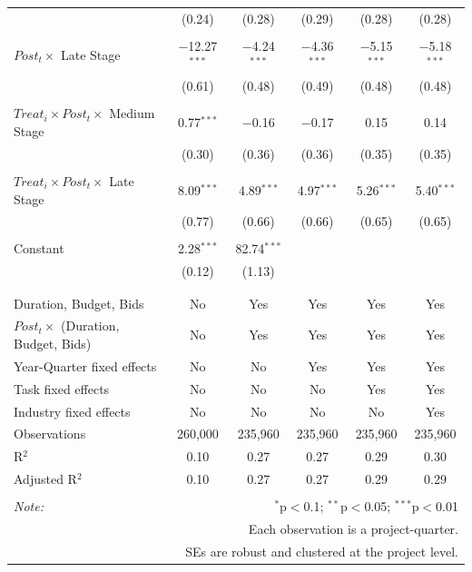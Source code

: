 \documentclass[
]{article}
\begin{document}
\begin{table}[H]
\begin{tabular}{@{\extracolsep{-2pt}}lccccc}
  & (0.24) & (0.28) & (0.29) & (0.28) & (0.28) \\ 
  & & & & & \\ 
 $Post_t \times$ Late Stage & $-$12.27$^{***}$ & $-$4.24$^{***}$ & $-$4.36$^{***}$ & $-$5.15$^{***}$ & $-$5.18$^{***}$ \\ 
  & (0.61) & (0.48) & (0.49) & (0.48) & (0.48) \\ 
  & & & & & \\ 
 $Treat_i \times Post_t \times$ Medium Stage & 0.77$^{***}$ & $-$0.16 & $-$0.17 & 0.15 & 0.14 \\ 
  & (0.30) & (0.36) & (0.36) & (0.35) & (0.35) \\ 
  & & & & & \\ 
 $Treat_i \times Post_t \times$ Late Stage & 8.09$^{***}$ & 4.89$^{***}$ & 4.97$^{***}$ & 5.26$^{***}$ & 5.40$^{***}$ \\ 
  & (0.77) & (0.66) & (0.66) & (0.65) & (0.65) \\ 
  & & & & & \\ 
 Constant & 2.28$^{***}$ & 82.74$^{***}$ &  &  &  \\ 
  & (0.12) & (1.13) &  &  &  \\ 
  & & & & & \\ 
\hline \\[-1.8ex] 
Duration, Budget, Bids & No & Yes & Yes & Yes & Yes \\ 
$Post_t \times $  (Duration, Budget, Bids) & No & Yes & Yes & Yes & Yes \\ 
Year-Quarter fixed effects & No & No & Yes & Yes & Yes \\ 
Task fixed effects & No & No & No & Yes & Yes \\ 
Industry fixed effects & No & No & No & No & Yes \\ 
Observations & 260,000 & 235,960 & 235,960 & 235,960 & 235,960 \\ 
R$^{2}$ & 0.10 & 0.27 & 0.27 & 0.29 & 0.30 \\ 
Adjusted R$^{2}$ & 0.10 & 0.27 & 0.27 & 0.29 & 0.29 \\ 
\hline 
\hline \\[-1.8ex] 
\textit{Note:}  & \multicolumn{5}{r}{$^{*}$p$<$0.1; $^{**}$p$<$0.05; $^{***}$p$<$0.01} \\ 
 & \multicolumn{5}{r}{Each observation is a project-quarter.} \\ 
 & \multicolumn{5}{r}{SEs are robust and clustered at the project level.} \\ 
\end{tabular} 
\end{table}
\end{document}
